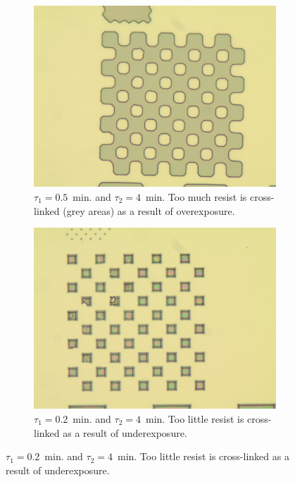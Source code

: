 \begin{figure}[!b]
    \centering
    \begin{subfigure}[t]{0.3\linewidth}
        \centering
        \includegraphics[width=\textwidth]{data/b2d1.jpg}
	    \caption{$\tau_1 = 0.5$~min. and $\tau_2 = 4$~min. Too much resist is cross-linked (grey areas) as a result of overexposure.}
	    \label{fig:b2d1}
    \end{subfigure}
    \hfill
    \begin{subfigure}[t]{0.3\linewidth}
        \centering
        \includegraphics[width=\textwidth]{data/b2h1.jpg}
	    \caption{$\tau_1 = 0.2$~min. and $\tau_2 = 4$~min. Too little resist is cross-linked as a result of underexposure.}
	    \label{fig:b2h1}

\end{subfigure}
\end{figure}
